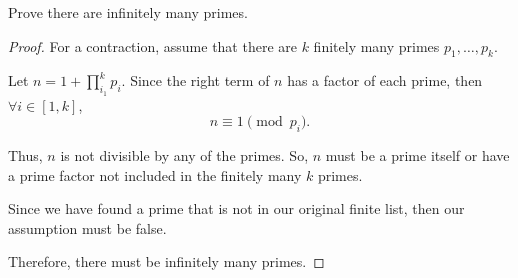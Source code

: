 \documentclass[../hw1]{subfiles}
\begin{document}
\begin{problem}[9]
Prove there are infinitely many primes.
\end{problem}
\begin{proof}
	For a contraction, assume that there are $k$ finitely many primes $p_1,\ldots,p_k$.

	Let $n = 1 + \prod_{i_1}^k p_i$. Since the right term of $n$ has a factor of each prime,
	then $\forall i \in [1,k]$, \[
		n \equiv 1 \pmod{p_i}
		.\]

	Thus, $n$ is not divisible by any of the primes. So, $n$ must be a prime itself or have a prime factor not included in the finitely many $k$ primes.

	Since we have found a prime that is not in our original finite list, then our assumption must be false.

	Therefore, there must be infinitely many primes.
\end{proof}
\end{document}
